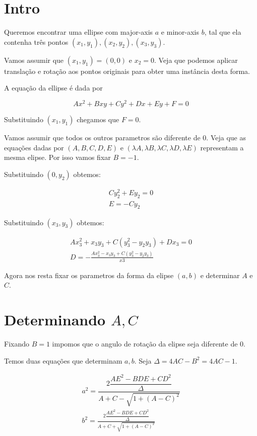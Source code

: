 \documentclass{article}
\begin{document}
	\section{Intro}
	Queremos encontrar uma ellipse com major-axis $a$ e minor-axis $b$, tal que ela contenha três pontos $(x_1, y_1), (x_2, y_2), (x_3, y_3)$.
	
	Vamos assumir que $(x_1, y_1) = (0,0)$ e $x_2 = 0$. Veja que podemos aplicar translação e rotação aos pontos originais para obter uma instância desta forma.
	
	A equação da ellipse é dada por
	
	\begin{equation}
	Ax^2 + Bxy + Cy^2 + Dx + Ey + F = 0
	\end{equation}
	
	Substituindo $(x_1, y_1)$ chegamos que $F=0$.
	
	Vamos assumir que todos os outros parametros são diferente de $0$. Veja que  as equações dadas por $(A, B, C, D, E)$ e $(\lambda A, \lambda B, \lambda C, \lambda D, \lambda E)$ representam a mesma elipse. Por isso vamos fixar $B=-1$.
	

	
	Substituindo $(0, y_2)$ obtemos:
	
	\begin{align*}
	Cy_2^2 + Ey_2 = 0\\
	E = -Cy_2
	\end{align*}
	
	Substituindo $(x_3, y_3)$ obtemos:
	
	\begin{align*}
	Ax_3^2 + x_3y_3 + C(y_3^2 - y_2y_3) + Dx_3 = 0\\
	D = -\frac{Ax_3^2 - x_3y_3 + C(y_3^2 - y_2y_3)}{x3}
	\end{align*}
	
	Agora nos resta fixar os parametros da forma da elipse $(a, b)$ e determinar $A$ e $C$.

	\section{Determinando $A, C$}
	
	Fixando $B=1$ impomos que o angulo de rotação da elipse seja diferente de $0$.
	
	Temos duas equações que determinam $a,b$. Seja $\Delta=4AC-B^2=4AC-1$.
	
	\begin{align}
	a^2 = \dfrac{2\dfrac{AE^2 -BDE +CD^2}{\Delta}}{A + C - \sqrt{1 + (A-C)^2}}\\
	b^2 = \frac{2\dfrac{AE^2 -BDE +CD^2}{\Delta}}{A + C + \sqrt{1 + (A-C)^2}}
	\end{align}
	
\end{document}
